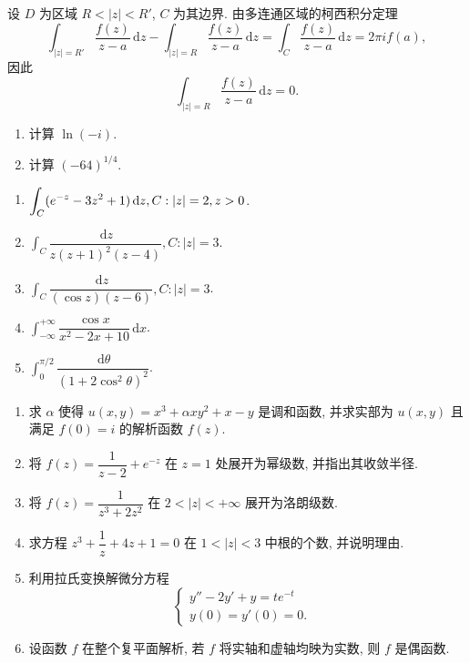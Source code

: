 \documentclass[simple]{hfutexam}
\newcommand{\diff}{\,\mathrm{d}}
\let\Im\relax
\DeclareMathOperator\Im{Im}
\begin{document}
设 $D$ 为区域 $R<|z|<R'$, $C$ 为其边界.
由多连通区域的柯西积分定理
\[\int_{|z|=R'} \frac{f(z)}{z-a}\diff z-\int_{|z|=R} \frac{f(z)}{z-a}\diff z=\int_C \frac{f(z)}{z-a}\diff z=2\pi if(a),\]
因此
  \[\int_{|z|=R} \frac{f(z)}{z-a}\diff z=0.\]

\newpage
{}
\maketitle

\begin{enumerate}
\item 计算 $\ln (-i)$.
\item 计算 $(-64)^{1/4}$.
\end{enumerate}

\begin{enumerate}
\item $\displaystyle\int_C(e^{-z}-3z^2+1)\diff z, C:|z|=2,\Im z>0$.
\item $\displaystyle\int_C\dfrac{\diff z}{z(z+1)^2(z-4)}, C:|z|=3$.
\item $\displaystyle\int_C\dfrac{\diff z}{(\cos z)(z-6)}, C:|z|=3$.
\item $\displaystyle\int_{-\infty}^{+\infty}\dfrac{\cos x}{x^2-2x+10}\diff x$.
\item $\displaystyle\int_0^{\pi/2}\dfrac{\diff \theta}{(1+2\cos^2\theta)^2}$.
\end{enumerate}

\begin{enumerate}
\item 求 $\alpha$ 使得 $u(x,y)=x^3+\alpha xy^2+x-y$ 是调和函数, 并求实部为 $u(x,y)$ 且满足 $f(0)=i$ 的解析函数 $f(z)$.
\item 将 $f(z)=\dfrac{1}{z-2}+e^{-z}$ 在 $z=1$ 处展开为幂级数, 并指出其收敛半径.
\item 将 $f(z)=\dfrac{1}{z^3+2z^2}$ 在 $2<|z|<+\infty$ 展开为洛朗级数.
\item 求方程 $z^3+\dfrac{1}{z}+4z+1=0$ 在 $1<|z|<3$ 中根的个数, 并说明理由.
\item 利用拉氏变换解微分方程 
\[\begin{cases}
y''-2y'+y=te^{-t}&\\
y(0)=y'(0)=0.&
\end{cases}\]
\item 设函数 $f$ 在整个复平面解析, 若 $f$ 将实轴和虚轴均映为实数, 则 $f$ 是偶函数.
\end{enumerate}
\end{document}
